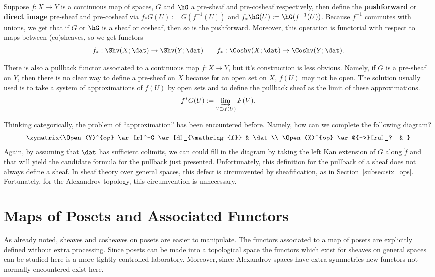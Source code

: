 \begin{defn}
	Suppose $f:X\to Y$ is a continuous map of spaces, $G$ and $\hG$ a pre-sheaf and pre-cosheaf respectively, then define the \textbf{pushforward} or \textbf{direct image} pre-sheaf and pre-cosheaf via $f_*G(U):=G(f^{-1}(U))$ and $f_*\hG(U):=\hG(f^{-1}(U))$. Because $f^{-1}$ commutes with unions, we get that if $G$ or $\hG$ is a sheaf or cosheaf, then so is the pushforward. Moreover, this operation is functorial with respect to maps between (co)sheaves, so we get functors
	\[
	f_*:\Shv(X;\dat) \to \Shv(Y;\dat) \qquad f_*:\Coshv(X;\dat)\to\Coshv(Y;\dat).
	\]
\end{defn} 

There is also a pullback functor associated to a continuous map $f:X\to Y$, but it's construction is less obvious. Namely, if $G$ is a pre-sheaf on $Y$, then there is no clear way to define a pre-sheaf on $X$ because for an open set on $X$, $f(U)$ may not be open. The solution usually used is to take a system of approximations of $f(U)$ by open sets and to define the pullback sheaf as the limit of these approximations.
\[
	f^*G(U):=\varinjlim_{V\supset f(U)} F(V).
\]

Thinking categorically, the problem of ``approximation'' has been encountered before. Namely, how can we complete the following diagram?
\[
\xymatrix{\Open(Y)^{op} \ar[r]^-G \ar[d]_{\mathring{f}} & \dat \\
\Open(X)^{op} \ar@{-->}[ru]_? & }
\]
Again, by assuming that $\dat$ has sufficient colimits, we can could fill in the diagram by taking the left Kan extension of $G$ along $\mathring{f}$ and that will yield the candidate formula for the pullback just presented. Unfortunately, this definition for the pullback of a sheaf does not always define a sheaf. In sheaf theory over general spaces, this defect is circumvented by sheafification, as in Section~\ref{subsec:six_ops}. Fortunately, for the Alexandrov topology, this circumvention is unnecessary.

\section{Maps of Posets and Associated Functors}
\label{subsec:map_functors}

As already noted, sheaves and cosheaves on posets are easier to manipulate. The functors associated to a map of posets are explicitly defined without extra processing. Since posets can be made into a topological space the functors which exist for sheaves on general spaces can be studied here is a more tightly controlled laboratory. Moreover, since Alexandrov spaces have extra symmetries new functors not normally encountered exist here. 

